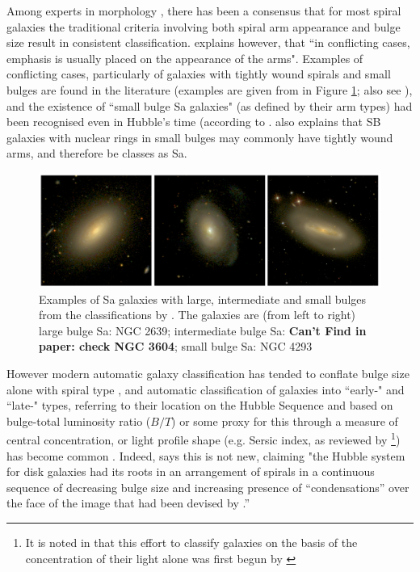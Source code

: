 \documentclass[usenatbib]{mn2e}
\begin{document}
Among experts in morphology \citep[e.g.]{Sandage2005,Buta2013}, there has been a consensus that for most spiral galaxies the traditional criteria involving both spiral arm appearance and bulge size result in consistent classification. \citet{Buta2013} explains however, that ``in conflicting cases, emphasis is usually placed on the appearance of the arms". Examples of conflicting cases, particularly of galaxies with tightly wound spirals and small bulges are found in the literature (examples are given from \citealt{Hogg1993} in Figure \ref{Sa}; also see \citealt{Sandage1961, SandageBedke1994, Jore1996}), and the existence of ``small bulge Sa galaxies" (as defined by their arm types) had been recognised even in Hubble's time (according to \citealt{Sandage2005}. \citet{Buta2013} also explains that SB galaxies with nuclear rings in small bulges may commonly have tightly wound arms, and therefore be classes as Sa. 

\begin{figure}
\includegraphics[width=160mm]{ExampleSas.png}
\caption{Examples of Sa galaxies with large, intermediate and small bulges from the classifications by \citet{Hogg1993}.  The galaxies are (from left to right) large bulge Sa: NGC 2639; intermediate bulge Sa: {\bf Can't Find in paper: check NGC 3604}; small bulge Sa: NGC 4293\label{Sa}}
\end{figure}

However modern automatic galaxy classification has tended to conflate bulge size alone with spiral type \citep[e.g.]{Goto2003, Laurikainen2007, Masters2010}, and automatic classification of galaxies into ``early-" and ``late-" types, referring to their location on the Hubble Sequence and based on bulge-total luminosity ratio ($B/T$) or some proxy for this through a measure of central concentration, or light profile shape (e.g. Sersic index, as reviewed by \citealt{2005PASA...22..118G}\footnote{It is noted in \citet{Sandage2005} that this effort to classify galaxies on the basis of the concentration of their light alone was first begun by \citet{Shapley1927}}) has become common \citep[e.g.]{vanderWel2011}. Indeed, \citep{Sandage2005} says this is not new, claiming "the Hubble system for disk galaxies had its roots in an arrangement of spirals in a continuous sequence of decreasing bulge size and increasing presence of ``condensations'' over the face of the image that had been devised by \citet{Reynolds1920}.''
\end{document}
